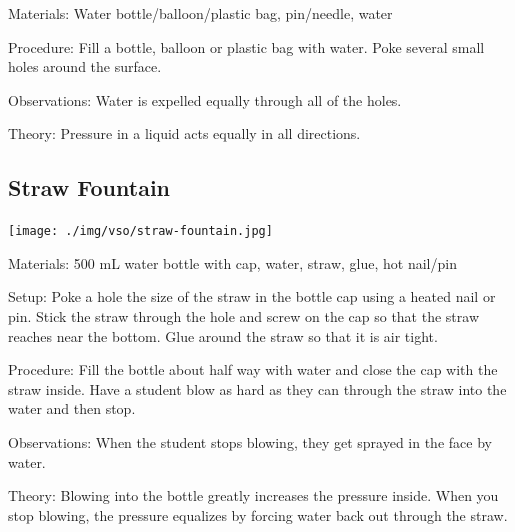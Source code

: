 \begin{multicols}{2}
\begin{description*}
\item[Materials:]{Water bottle/balloon/plastic bag, pin/needle, water}
\item[Procedure:]{Fill a bottle, balloon or plastic bag with water. Poke several small holes around the surface.}
\item[Observations:]{Water is expelled equally through all of the holes.}
\item[Theory:]{Pressure in a liquid acts equally in all directions.}
\end{description*}

\subsection{Straw Fountain}

\begin{center}
\texttt{[image: ./img/vso/straw-fountain.jpg]}
\end{center}

\begin{description*}
\item[Materials:]{500 mL water bottle with cap, water, straw, glue, hot nail/pin}
\item[Setup:]{Poke a hole the size of the straw in the bottle cap using a heated nail or pin. Stick the straw through the hole and screw on the cap so that the straw reaches near the bottom. Glue around the straw so that it is air tight.}
\item[Procedure:]{Fill the bottle about half way with water and close the cap with the straw inside. Have a student blow as hard as they can through the straw into the water and then stop.}
\item[Observations:]{When the student stops blowing, they get sprayed in the face by water.}
\item[Theory:]{Blowing into the bottle greatly increases the pressure inside. When you stop blowing, the pressure equalizes by forcing water back out through the straw.}
\end{description*}


\end{multicols}
